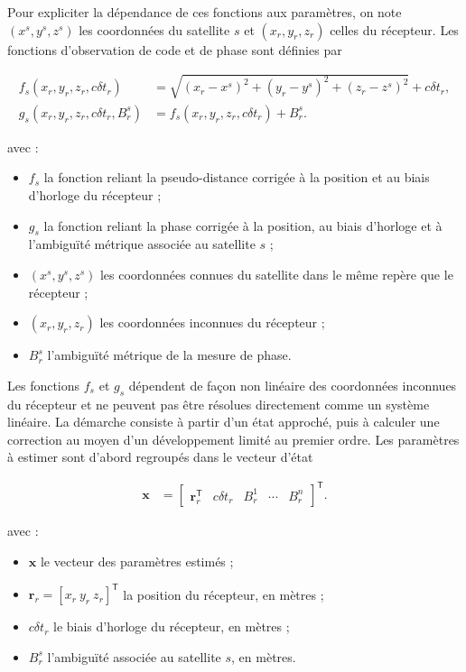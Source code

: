 Pour expliciter la dépendance de ces fonctions aux paramètres, on note
$(x^s,y^s,z^s)$ les coordonnées du satellite $s$ et
$(x_r,y_r,z_r)$ celles du récepteur. Les fonctions d'observation de code et de
phase sont définies par

\begin{align}
f_s(x_r,y_r,z_r,c\delta t_r)
&=
\sqrt{(x_r-x^s)^2+(y_r-y^s)^2+(z_r-z^s)^2}
+c\delta t_r,
\label{eq:code_observation_function}
\\
g_s(x_r,y_r,z_r,c\delta t_r,B_r^s)
&=
f_s(x_r,y_r,z_r,c\delta t_r)+B_r^s.
\label{eq:phase_observation_function}
\end{align}

avec :

\begin{itemize}
    \item $f_s$ la fonction reliant la pseudo-distance corrigée à la position et au biais d'horloge du récepteur ;
    \item $g_s$ la fonction reliant la phase corrigée à la position, au biais d'horloge et à l'ambiguïté métrique associée au satellite $s$ ;
    \item $(x^s,y^s,z^s)$ les coordonnées connues du satellite dans le même
    repère que le récepteur ;
    \item $(x_r,y_r,z_r)$ les coordonnées inconnues du récepteur ;
    \item $B_r^s$ l'ambiguïté métrique de la mesure de phase.
\end{itemize}


Les fonctions $f_s$ et $g_s$ dépendent de façon non linéaire des
coordonnées inconnues du récepteur et ne peuvent pas être résolues directement
comme un système linéaire. La démarche consiste à partir d'un état approché,
puis à calculer une correction au moyen d'un développement limité au premier
ordre. Les paramètres à estimer sont d'abord regroupés dans le vecteur d'état

\begin{align}
\mathbf x
&=
\begin{bmatrix}
\mathbf r_r^{\mathsf T} & c\delta t_r & B_r^1 & \cdots & B_r^n
\end{bmatrix}^{\mathsf T}.
\label{eq:static_state_vector}
\end{align}

avec :

\begin{itemize}
    \item $\mathbf x$ le vecteur des paramètres estimés ;
    \item $\mathbf r_r=[x_r\ y_r\ z_r]^{\mathsf T}$ la position du
    récepteur, en mètres ;
    \item $c\delta t_r$ le biais d'horloge du récepteur, en mètres ;
    \item $B_r^s$ l'ambiguïté associée au satellite $s$, en mètres.
\end{itemize}


